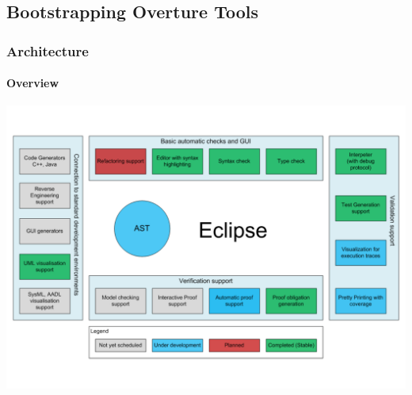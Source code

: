 \documentclass[slidestop,uncompress,mathserif,final]{beamer}
\begin{document}
\subsection[Overture]{Bootstrapping Overture Tools}
\label{sec:overture}

\begin{frame}[c]
  \frametitle{Architecture}
  \framesubtitle{Overview}

  \begin{center}
    \includegraphics[width=\textwidth]{images/overture_arch.pdf}
  \end{center}
\end{frame}
\end{document}
